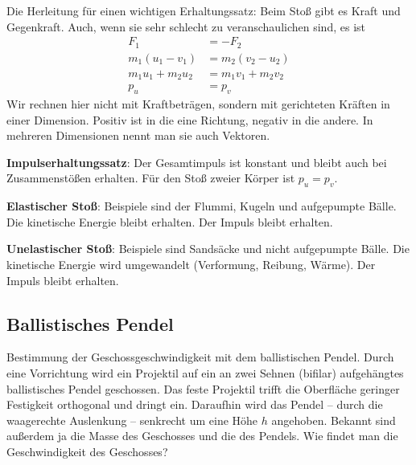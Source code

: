 \documentclass[a4paper,10pt,fleqn,twocolumn,twoside]{article}
\begin{document}
Die Herleitung für einen wichtigen Erhaltungssatz: Beim Stoß gibt es
Kraft und Gegenkraft. Auch, wenn sie sehr schlecht zu
veranschaulichen sind, es ist
\begin{align*}
F_1 &= -F_2\\
m_1(u_1-v_1) &= m_2(v_2-u_2)\\
m_1u_1+m_2u_2 &= m_1v_1+m_2v_2\\
p_u &= p_v
\end{align*}
Wir rechnen hier nicht mit Kraftbeträgen, sondern mit
gerichteten Kräften in einer Dimension. Positiv ist in die
eine Richtung, negativ in die andere. In mehreren Dimensionen nennt
man sie auch Vektoren.

\textbf{Impulserhaltungssatz}: Der Gesamtimpuls ist konstant
und bleibt auch bei Zusammenstößen erhalten. Für den Stoß zweier
Körper ist \(p_u=p_v\).

\textbf{Elastischer Stoß}: Beispiele sind der Flummi, Kugeln und
aufgepumpte Bälle. Die kinetische Energie bleibt erhalten.
Der Impuls bleibt erhalten.

\textbf{Unelastischer Stoß}: Beispiele sind Sandsäcke und nicht
aufgepumpte Bälle. Die kinetische Energie wird umgewandelt
(Verformung, Reibung, Wärme). Der Impuls bleibt erhalten.


\subsection{Ballistisches Pendel}

Bestimmung der Geschossgeschwindigkeit mit dem ballistischen Pendel.
Durch eine Vorrichtung wird ein Projektil auf ein an zwei Sehnen
(bifilar) aufgehängtes ballistisches Pendel geschossen. Das feste
Projektil trifft die Oberfläche geringer Festigkeit orthogonal und
dringt ein. Daraufhin wird das Pendel -- durch die waagerechte
Auslenkung -- senkrecht um eine Höhe \(h\) angehoben. Bekannt sind
außerdem ja die Masse des Geschosses und die des Pendels. Wie findet
man die Geschwindigkeit des Geschosses?
\end{document}
